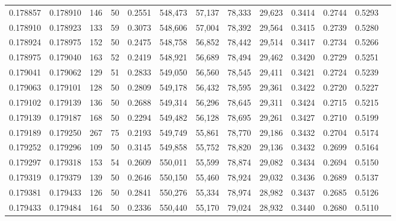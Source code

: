 \begin{tabular}{rrrrrrrrrrrrr}
0.178857 & 0.178910 &   146 &  50 &                                     0.2551 & 548,473 &  57,137 &  78,333 &  29,623 & 0.3414 & 0.2744 & 0.5293 \\
0.178910 & 0.178923 &   133 &  59 &                                     0.3073 & 548,606 &  57,004 &  78,392 &  29,564 & 0.3415 & 0.2739 & 0.5280 \\
0.178924 & 0.178975 &   152 &  50 &                                     0.2475 & 548,758 &  56,852 &  78,442 &  29,514 & 0.3417 & 0.2734 & 0.5266 \\
0.178975 & 0.179040 &   163 &  52 &                                     0.2419 & 548,921 &  56,689 &  78,494 &  29,462 & 0.3420 & 0.2729 & 0.5251 \\
0.179041 & 0.179062 &   129 &  51 &                                     0.2833 & 549,050 &  56,560 &  78,545 &  29,411 & 0.3421 & 0.2724 & 0.5239 \\
0.179063 & 0.179101 &   128 &  50 &                                     0.2809 & 549,178 &  56,432 &  78,595 &  29,361 & 0.3422 & 0.2720 & 0.5227 \\
0.179102 & 0.179139 &   136 &  50 &                                     0.2688 & 549,314 &  56,296 &  78,645 &  29,311 & 0.3424 & 0.2715 & 0.5215 \\
0.179139 & 0.179187 &   168 &  50 &                                     0.2294 & 549,482 &  56,128 &  78,695 &  29,261 & 0.3427 & 0.2710 & 0.5199 \\
0.179189 & 0.179250 &   267 &  75 &                                     0.2193 & 549,749 &  55,861 &  78,770 &  29,186 & 0.3432 & 0.2704 & 0.5174 \\
0.179252 & 0.179296 &   109 &  50 &                                     0.3145 & 549,858 &  55,752 &  78,820 &  29,136 & 0.3432 & 0.2699 & 0.5164 \\
0.179297 & 0.179318 &   153 &  54 &                                     0.2609 & 550,011 &  55,599 &  78,874 &  29,082 & 0.3434 & 0.2694 & 0.5150 \\
0.179319 & 0.179379 &   139 &  50 &                                     0.2646 & 550,150 &  55,460 &  78,924 &  29,032 & 0.3436 & 0.2689 & 0.5137 \\
0.179381 & 0.179433 &   126 &  50 &                                     0.2841 & 550,276 &  55,334 &  78,974 &  28,982 & 0.3437 & 0.2685 & 0.5126 \\
0.179433 & 0.179484 &   164 &  50 &                                     0.2336 & 550,440 &  55,170 &  79,024 &  28,932 & 0.3440 & 0.2680 & 0.5110 \\

\end{tabular}
